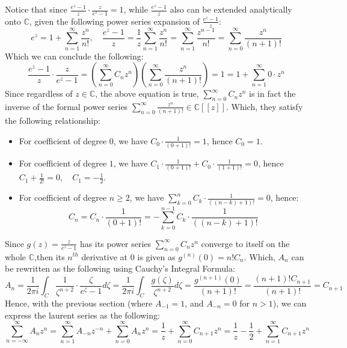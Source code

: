 \documentclass{article}
\begin{document}
Notice that since $\frac{e^z-1}{z}\cdot \frac{z}{e^z-1}=1$, while $\frac{e^z-1}{z}$ also can be extended analytically onto $\mathbb{C}$,
given the following power series expansion of $\frac{e^z-1}{z}$:
$$e^z=1+\sum_{n=1}^{\infty}\frac{z^n}{n!},\quad \frac{e^z-1}{z}=\frac{1}{z}\sum_{n=1}^{\infty}\frac{z^n}{n!}=\sum_{n=1}^{\infty}\frac{z^{n-1}}{n!}=\sum_{n=0}^{\infty}\frac{z^n}{(n+1)!}$$
Which we can conclude the following:
$$\frac{e^z-1}{z}\cdot \frac{z}{e^z-1}=\left(\sum_{n=0}^{\infty}C_nz^n\right)\left(\sum_{n=0}^{\infty}\frac{z^n}{(n+1)!}\right)=1 = 1 + \sum_{n=1}^{\infty}0\cdot z^n$$
Since regardless of $z\in\mathbb{C}$, the above equation is true, $\sum_{n=0}^{\infty}C_nz^n$ is in fact the inverse of the formal power series $\sum_{n=0}^{\infty}\frac{z^n}{(n+1)!}\in \mathbb{C}[[z]]$. Which, they satisfy the following relationship:
\begin{itemize}
    \item For coefficient of degree $0$, we have $C_0\cdot \frac{1}{(0+1)!}=1$, hence $C_0=1$.
    \item For coefficient of degree $1$, we have $C_1\cdot \frac{1}{(0+1)!}+C_0\cdot\frac{1}{(1+1)!}=0$, hence $C_1+\frac{1}{2!}=0,\quad C_1=-\frac{1}{2}$.
    \item For coefficient of degree $n\geq 2$, we have $\sum_{k=0}^{n}C_k\cdot \frac{1}{((n-k)+1)!}=0$, hence: 
    $$C_n=C_n\cdot\frac{1}{(0+1)!} = -\sum_{k=0}^{n-1}C_k\cdot\frac{1}{((n-k)+1)!}$$
\end{itemize}

\hfil

Since $g(z)=\frac{z}{e^z-1}$ has its power series $\sum_{n=0}^{\infty}C_nz^n$ converge to itself on the whole $\mathbb{C}$,then its $n^{th}$ derivative at $0$ is given as $g^{(n)}(0)=n!C_n$. Which, $A_n$ can be rewritten as the following using Cauchy's Integral Formula:
$$A_n=\frac{1}{2\pi i}\int_{C}\frac{1}{\zeta^{n+2}}\cdot\frac{\zeta}{e^\zeta-1}d\zeta=\frac{1}{2\pi i}\int_{C}\frac{g(\zeta)}{\zeta^{n+2}}d\zeta = \frac{g^{(n+1)}(0)}{(n+1)!}=\frac{(n+1)!C_{n+1}}{(n+1)!}=C_{n+1}$$
Hence, with the previous section (where $A_{-1}=1$, and $A_{-n}=0$ for $n>1$), we can express the laurent series as the following:
$$\sum_{n=-\infty}^{\infty}A_nz^n = \sum_{n=1}^{\infty}A_{-n}z^{-n}+\sum_{n=0}^{\infty}A_nz^n = \frac{1}{z}+\sum_{n=0}^{\infty}C_{n+1}z^n = \frac{1}{z}-\frac{1}{2}+\sum_{n=1}^{\infty}C_{n+1}z^n$$

\hfil



\break
\end{document}
